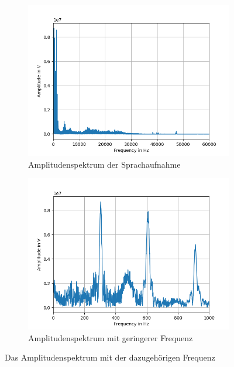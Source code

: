 \documentclass[12pt, oneside, a4paper, \docLanguage]{report}
\begin{document}
\begin{figure}[H]
\centering
	\begin{subfigure}{.5\textwidth}
  		\centering
 		 \includegraphics[width=.95\linewidth]{../data/img/testspektrum1.png}
  		\caption{Amplitudenspektrum der Sprachaufnahme}
 		 \label{fig:sub1}
	\end{subfigure}%
	\begin{subfigure}{.5\textwidth}
  		\centering
 		 \includegraphics[width=.95\linewidth]{../data/img/testspektrum3.png}
  		\caption{Amplitudenspektrum mit geringerer Frequenz}
  		\label{fig:sub2}
	\end{subfigure}
	\caption{Das Amplitudenspektrum mit der dazugehörigen Frequenz}
	\label{fig:test}
\end{figure}
\newline
\end{document}
